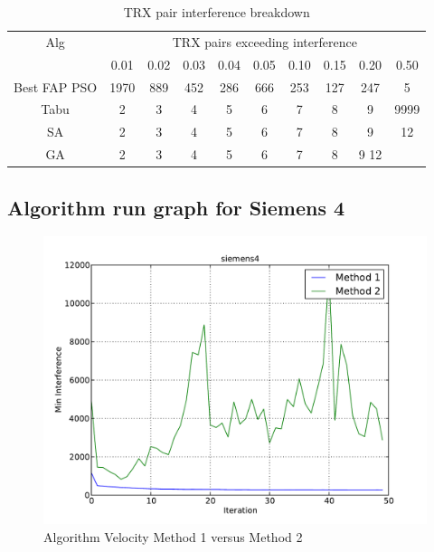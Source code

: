 \begin{table}[H]
\centering
	\begin{tabular}{cccccccccc}
	\toprule
    Alg & \multicolumn{9}{c}{TRX pairs exceeding interference}\\
    & 0.01 & 0.02 & 0.03 & 0.04 & 0.05 & 0.10 & 0.15 & 0.20 & 0.50 \\
    \midrule
    Best FAP PSO & 1970 & 889 & 452 & 286 & 666 & 253 & 127 & 247 & 5\\
    Tabu & 2 & 3 & 4 & 5 & 6 & 7 & 8 & 9 & 9999\\
    SA & 2 & 3 & 4 & 5 & 6 & 7 & 8 & 9 & 12\\
    GA & 2 & 3 & 4 & 5 & 6 & 7 & 8 & 9  12\\
    \bottomrule
	\end{tabular}
\caption{TRX pair interference breakdown}
\label{tab:breakdown-siem4m1}
\end{table}
\subsection{Algorithm run graph for Siemens 4}
\begin{figure}[H]
	\begin{centering}
    \includegraphics[scale=0.5]{../Implementation/data-cruncher/graph/siemens4.pdf}
	\caption{Algorithm Velocity Method 1 versus Method 2}
	\label{fig:siem4graph}
	\end{centering}
\end{figure}



